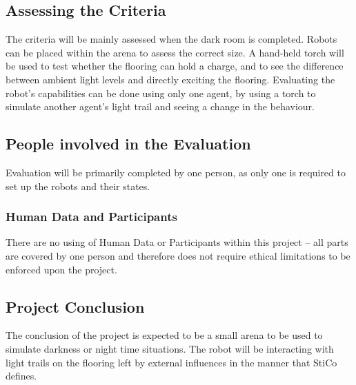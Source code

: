 \subsection{Assessing the Criteria} \label{desEvalAss}
The criteria will be mainly assessed when the dark room is completed.  Robots
can be placed within the arena to assess the correct size.  A hand-held torch
will be used to test whether the flooring can hold a charge, and to see the
difference between ambient light levels and directly exciting the flooring.
Evaluating the robot's capabilities can be done using only one agent, by using
a torch to simulate another agent's light trail and seeing a change in the
behaviour.

\subsection{People involved in the Evaluation} \label{desEvalPeople}
Evaluation will be primarily completed by one person, as only one is required to
set up the robots and their states.

\subsubsection{Human Data and Participants} \label{desEvalHDP}
There are no using of Human Data or Participants within this project -- all
parts are covered by one person and therefore does not require ethical 
limitations to be enforced upon the project.

\subsection{Project Conclusion} \label{desEvalCon}
The conclusion of the project is expected to be a small arena to be used to
simulate darkness or night time situations.  The robot will be interacting with
light trails on the flooring left by external influences in the manner that
StiCo defines.

\clearpage